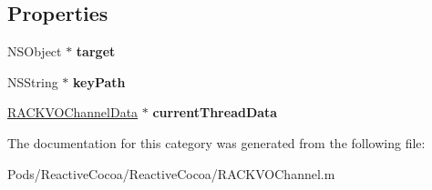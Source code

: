 \subsection*{Properties}
\begin{DoxyCompactItemize}
\item 
\mbox{\label{category_r_a_c_k_v_o_channel_07_08_a465e437d5b0e36a9e8e6e3e0885a4d95}} 
N\+S\+Object $\ast$ {\bfseries target}
\item 
\mbox{\label{category_r_a_c_k_v_o_channel_07_08_af957bcd5561e923fc348d94cb1e3a116}} 
N\+S\+String $\ast$ {\bfseries key\+Path}
\item 
\mbox{\label{category_r_a_c_k_v_o_channel_07_08_ae6fe1656d6b4f114b015e7ffe198362f}} 
\mbox{\hyperlink{interface_r_a_c_k_v_o_channel_data}{R\+A\+C\+K\+V\+O\+Channel\+Data}} $\ast$ {\bfseries current\+Thread\+Data}
\end{DoxyCompactItemize}


The documentation for this category was generated from the following file\+:\begin{DoxyCompactItemize}
\item 
Pods/\+Reactive\+Cocoa/\+Reactive\+Cocoa/R\+A\+C\+K\+V\+O\+Channel.\+m\end{DoxyCompactItemize}
